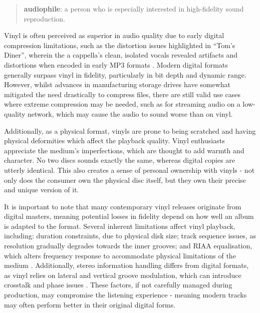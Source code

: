                \begin{quote}
                    \textbf{audiophile}: a person who is especially interested in high-fidelity sound reproduction. \cite{audiophile2025}
                \end{quote}
    
                Vinyl is often perceived as superior in audio quality due to early digital compression limitations, such as the distortion issues highlighted in ``Tom's Diner'', wherein the a cappella's clean, isolated vocals revealed artifacts and distortions when encoded in early MP3 formats \cite{TODO}. Modern digital formats generally surpass vinyl in fidelity, particularly in bit depth and dynamic range. However, whilst advances in manufacturing storage drives have somewhat mitigated the need drastically to compress files, there are still valid use cases where extreme compression may be needed, such as for streaming audio on a low-quality network, which may cause the audio to sound worse than on vinyl.
    
                Additionally, as a physical format, vinyls are prone to being scratched and having physical deformities which affect the playback quality. Vinyl enthusiasts appreciate the medium’s imperfections, which are thought to add warmth and character. No two discs sounds exactly the same, whereas digital copies are utterly identical. This also creates a sense of personal ownership with vinyls - not only does the consumer own the physical disc itself, but they own their precise and unique version of it.
    
                It is important to note that many contemporary vinyl releases originate from digital masters, meaning potential losses in fidelity depend on how well an album is adapted to the format. Several inherent limitations affect vinyl playback, including: duration constraints, due to physical disk size; track sequence issues, as resolution gradually degrades towards the inner grooves; and RIAA equalisation, which alters frequency response to accommodate physical limitations of the medium \cite{engineeringvinyls}. Additionally, stereo information handling differs from digital formats, as vinyl relies on lateral and vertical groove modulation, which can introduce crosstalk and phase issues \cite{engineeringvinyls}. These factors, if not carefully managed during production, may compromise the listening experience - meaning modern tracks may often perform better in their original digital forms.
    
